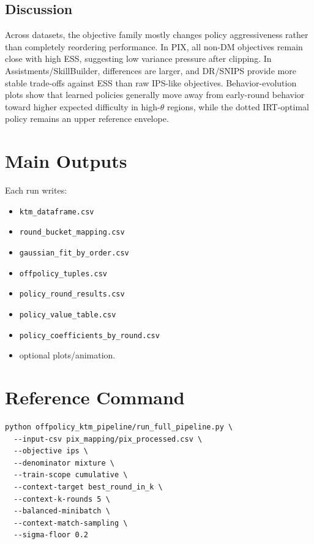 \documentclass[11pt]{article}
\begin{document}
\subsection{Discussion}
Across datasets, the objective family mostly changes policy aggressiveness rather than
completely reordering performance. In PIX, all non-DM objectives remain close with high ESS,
suggesting low variance pressure after clipping. In Assistments/SkillBuilder, differences are
larger, and DR/SNIPS provide more stable trade-offs against ESS than raw IPS-like objectives.
Behavior-evolution plots show that learned policies generally move away from early-round behavior
toward higher expected difficulty in high-$\theta$ regions, while the dotted IRT-optimal policy
remains an upper reference envelope.

\section{Main Outputs}
Each run writes:
\begin{itemize}
  \item \texttt{ktm\_dataframe.csv}
  \item \texttt{round\_bucket\_mapping.csv}
  \item \texttt{gaussian\_fit\_by\_order.csv}
  \item \texttt{offpolicy\_tuples.csv}
  \item \texttt{policy\_round\_results.csv}
  \item \texttt{policy\_value\_table.csv}
  \item \texttt{policy\_coefficients\_by\_round.csv}
  \item optional plots/animation.
\end{itemize}

\section{Reference Command}
\begin{verbatim}
python offpolicy_ktm_pipeline/run_full_pipeline.py \
  --input-csv pix_mapping/pix_processed.csv \
  --objective ips \
  --denominator mixture \
  --train-scope cumulative \
  --context-target best_round_in_k \
  --context-k-rounds 5 \
  --balanced-minibatch \
  --context-match-sampling \
  --sigma-floor 0.2
\end{verbatim}
\end{document}

